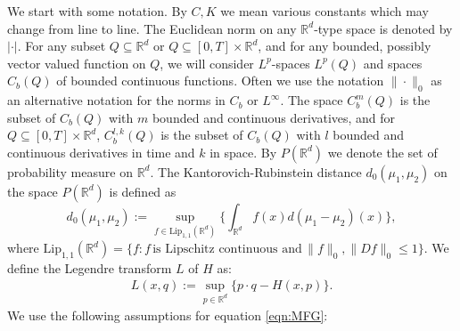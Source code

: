 \documentclass[a4paper,  twoside, 10pt, leqno]{amsart}
\newcommand{\N}{\mathbb{N}}
\newcommand{\R}{\mathbb{R}}
\newcommand{\rd}{\mathbb{R}^d}
\newcommand{\Lip}{\mbox{Lip}}
\newtheorem{definition}[thm]{Definition}
\theoremstyle{remark}
\theoremstyle{definition}
\begin{document}
We start with some notation. By $C, K$ we mean various constants which may change from line to line. 
The Euclidean norm on any $\mathbb{R}^d$-type space is
denoted by $|\cdot|$. For any subset $Q\subseteq
\mathbb{R}^d$ or $Q \subseteq [0,T] \times \mathbb{R}^d$, and for any bounded, possibly vector valued
function on $Q$, we will consider $L^p$-spaces $L^{p}(Q)$ and spaces $C_b(Q)$ of bounded continuous %
functions. Often we use the notation $\|\cdot\|_0$ as an alternative notation for the norms in $C_b$ or $L^\infty$. The space $C^m_b(Q)$ is the  subset of $C_b(Q)$ with $m$ bounded and continuous derivatives, and for $Q \subseteq [0,T] \times \rd$, 
$C^{l,k}_b(Q)$ is the subset of $C_b(Q)$ with $l$ bounded and continuous derivatives in time and $k$ in space. 
By $P(\rd)$ we denote the set of probability measure on $\rd$. The Kantorovich-Rubinstein  distance $d_0(\mu_1,\mu_2)$ on the space $P(\rd)$ is defined as 
$$d_0(\mu_1,\mu_2) := \sup_{f\in \Lip_{1,1}(\rd)}\Big\{\int_{\rd}f(x) d(\mu_1-\mu_2)(x)\Big\},$$
where $\Lip_{1,1}(\rd) = \Big\{f : f \, \mbox{is Lipschitz continuous and} \, \|f\|_{0}, \|Df\|_{0}\leq 1 \Big\}$. 
\medskip
We define the Legendre transform $L$ of $H$ as:
\begin{align*}
    L (x,q) := \sup_{p \in \R^d} \big\{ p\cdot q - H(x,p) \big\}.
\end{align*}
We use the following assumptions for equation \eqref{eqn:MFG}: 
\end{document}
